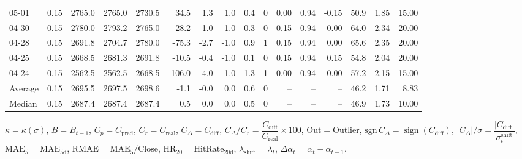 \begin{threeparttable}
{\begin{tabular}{lrrrrrrrrrrrrrrr}
  05-01 &     0.15 & 2765.0 & 2765.0 & 2730.5 &       34.5 &            1.3 &                      1.0 &                 0.4 &              0 &       0.00 &      0.94 &          -0.15 &             50.9 &            1.85 &                  15.00 \\
  04-30 &     0.15 & 2780.0 & 2793.2 & 2765.0 &       28.2 &            1.0 &                      1.0 &                 0.3 &              0 &       0.15 &      0.94 &           0.00 &             64.0 &            2.34 &                  20.00 \\
  04-28 &     0.15 & 2691.8 & 2704.7 & 2780.0 &      -75.3 &           -2.7 &                     -1.0 &                 0.9 &              1 &       0.15 &      0.94 &           0.00 &             65.6 &            2.35 &                  20.00 \\
  04-25 &     0.15 & 2668.5 & 2681.3 & 2691.8 &      -10.5 &           -0.4 &                     -1.0 &                 0.1 &              0 &       0.15 &      0.94 &           0.15 &             54.8 &            2.04 &                  20.00 \\
  04-24 &     0.15 & 2562.5 & 2562.5 & 2668.5 &     -106.0 &           -4.0 &                     -1.0 &                 1.3 &              1 &       0.00 &      0.94 &           0.00 &             57.2 &            2.15 &                  15.00 \\
Average &     0.15 & 2695.5 & 2697.5 & 2698.6 &       -1.1 &           -0.0 &                      0.0 &                 0.6 &              0 &         -- &        -- &             -- &             46.2 &            1.71 &                   8.83 \\
 Median &     0.15 & 2687.4 & 2687.4 & 2687.4 &        0.5 &            0.0 &                      0.0 &                 0.5 &              0 &         -- &        -- &             -- &             46.9 &            1.73 &                  10.00 \\
\bottomrule
\end{tabular}
}
\begin{tablenotes}\footnotesize
\item $\kappa=\kappa(\sigma)$, $B=B_{t-1}$, $C_p=C_{\text{pred}}$, $C_r=C_{\text{real}}$, $C_\Delta=C_{\text{diff}}$, $C_\Delta/C_r=\dfrac{C_{\text{diff}}}{C_{\text{real}}}\times100$, $\mathrm{Out}=\text{Outlier}$, $\mathrm{sgn}\,C_\Delta=\operatorname{sign}(C_{\text{diff}})$, $|C_\Delta|/\sigma=\dfrac{|C_{\text{diff}}|}{\sigma_t^{\text{shift}}}$, $\mathrm{MAE}_5=\mathrm{MAE}_{5\text{d}}$, $\mathrm{RMAE}= \mathrm{MAE}_5 / \text{Close}$, $\mathrm{HR}_{20}=\mathrm{HitRate}_{20\text{d}}$, 
$\lambda_{\text{shift}}=\lambda_t$, 
$\Delta\alpha_t=\alpha_t-\alpha_{t-1}$.
\end{tablenotes}
\end{threeparttable}
\endgroup


